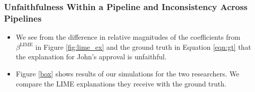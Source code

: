 \documentclass[mnsc,blindrev]{informs3}
\newlength\mylenC
\newlength\mylenD
\begin{document}
\subsubsection{Unfaithfulness Within a Pipeline and Inconsistency Across Pipelines}
\begin{itemize}
   \item We see from the difference in relative magnitudes of the coefficients from $\beta^{\text{LIME}}$ in Figure \ref{fig:lime_ex} and the ground truth in Equation \ref{eqn:gt} that the explanation for John's approval is unfaithful. 
   
    \item Figure \ref{box} shows results of our simulations for the two researchers. We compare the LIME explanations they receive with the ground truth.
     
\settowidth{} 
\setlength{}


\end{itemize}
\end{document}
